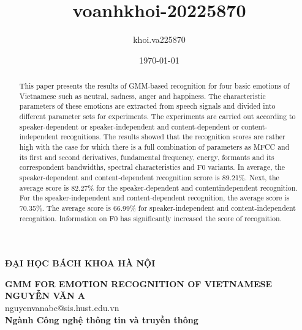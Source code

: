 \documentclass[a4paper,12pt]{article}
\title{voanhkhoi-20225870}
\author{khoi.va225870 }
\date{\today}
\begin{document}
\begin{center}

{\textbf{\large{ĐẠI HỌC BÁCH KHOA HÀ NỘI}}}\\[3cm]

{\textbf{\Large{GMM FOR EMOTION RECOGNITION OF VIETNAMESE}}\\[1cm]

{\textbf{\large{NGUYỄN VĂN A}}}\\
{\large{nguyenvanabc@sis.hust.edu.vn}}\\[0.5cm]

{\textbf{\large{Ngành Công nghệ thông tin và truyền thông}}}\\

\vspace{2cm}
\begin{table}[h]
\centering
{}
\end{table}}
\end{center}
\tableofcontents
\listoftables
\listoffigures

\begin{abstract}
    This paper presents the results of GMM-based recognition for four basic emotions of
Vietnamese such as neutral, sadness, anger and happiness. The characteristic parameters of these
emotions are extracted from speech signals and divided into different parameter sets for experiments.
The experiments are carried out according to speaker-dependent or speaker-independent and content-dependent or content-independent recognitions. The results showed that the recognition scores are
rather high with the case for which there is a full combination of parameters as MFCC and its first
and second derivatives, fundamental frequency, energy, formants and its correspondent bandwidths,
spectral characteristics and F0 variants. In average, the speaker-dependent and content-dependent
recognition scrore is 89.21\%. Next, the average score is 82.27\% for the speaker-dependent and contentindependent recognition. For the speaker-independent and content-dependent recognition, the average score is 70.35\%. The average score is 66.99\% for speaker-independent and content-independent
recognition. Information on F0 has significantly increased the score of recognition.

\end{abstract}
\end{document}
